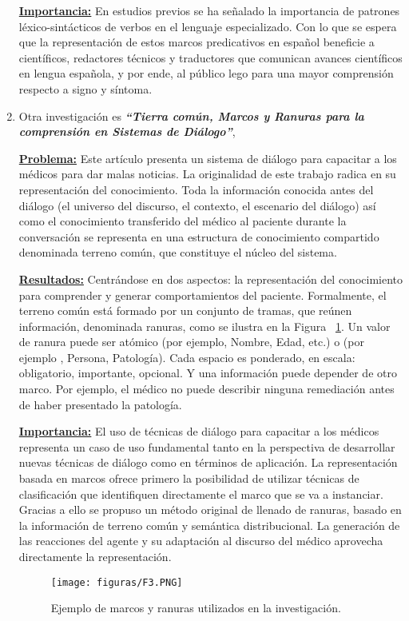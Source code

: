 \documentclass[10pt,conference]{IEEEtran}
\begin{document}
\begin{enumerate}
\textbf{\underline{Importancia:}} En estudios previos se ha señalado la importancia de patrones léxico-sintácticos de verbos en el lenguaje especializado. Con lo que se espera que la representación de estos marcos predicativos en español beneficie a científicos, redactores técnicos y traductores que comunican avances científicos en lengua española, y por ende, al público lego para una mayor comprensión respecto a signo y síntoma.

\item Otra investigación es \textit{\textbf{“Tierra común, Marcos y Ranuras para la comprensión en Sistemas de Diálogo”}}, \citep{blache2021common}

\textbf{\underline{Problema:}} Este artículo presenta un sistema de diálogo para capacitar a los médicos para dar malas noticias. La originalidad de este trabajo radica en su representación del conocimiento. Toda la información conocida antes del diálogo (el universo del discurso, el contexto, el escenario del diálogo) así como el conocimiento transferido del médico al paciente durante la conversación se representa en una estructura de conocimiento compartido denominada terreno común, que constituye el núcleo del sistema.

\textbf{\underline{Resultados:}}
Centrándose en dos aspectos: la representación del conocimiento para comprender y generar comportamientos del paciente. Formalmente, el terreno común está formado por un conjunto de tramas, que reúnen información, denominada ranuras, como se ilustra en la Figura ~\ref{F3}. Un valor de ranura puede ser atómico (por ejemplo, Nombre, Edad, etc.) o (por ejemplo , Persona, Patología). Cada espacio es ponderado, en escala: obligatorio, importante, opcional. Y una información puede depender de otro marco. Por ejemplo, el médico no puede describir ninguna remediación antes de haber presentado la patología.

\textbf{\underline{Importancia:}}
El uso de técnicas de diálogo para capacitar a los médicos representa un caso de uso fundamental
tanto en la perspectiva de desarrollar nuevas técnicas de diálogo como en términos de aplicación. La representación basada en marcos ofrece primero la posibilidad de utilizar técnicas de clasificación que identifiquen directamente el marco que se va a instanciar. Gracias a ello se propuso un método original de llenado de ranuras, basado en la información de terreno común y semántica distribucional. La generación de las reacciones del agente y su adaptación al discurso del médico aprovecha directamente la representación.

\begin{figure}[H]
\begin{center}
\texttt{[image: figuras/F3.PNG]}
\caption{Ejemplo de marcos y ranuras utilizados en la investigación.}
\label{F3} 
\end{center}
\end{figure}



\end{enumerate}
\end{document}
